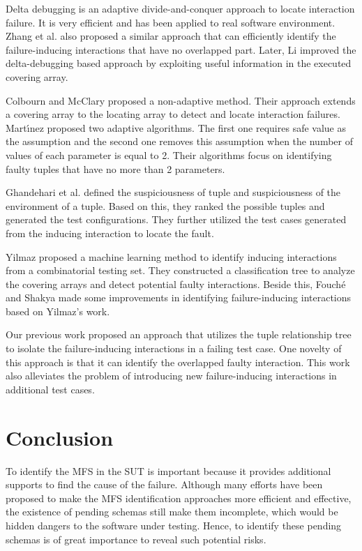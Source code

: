 {Delta debugging \cite{zeller2002simplifying} is an adaptive divide-and-conquer approach to locate interaction failure. It is very efficient and has been applied to real software environment. Zhang et al. \cite{zhang2011characterizing} also proposed a similar approach that can efficiently identify the failure-inducing interactions that have no overlapped part. Later, Li \cite{li2012improved} improved the delta-debugging based approach by exploiting useful information in the executed covering array.

Colbourn and McClary \cite{colbourn2008locating} proposed a non-adaptive method. Their approach extends a covering array to the locating array to detect and locate interaction failures. Mart{\'\i}nez \cite{martinez2008algorithms,martinez2009locating} proposed two adaptive algorithms. The first one requires safe value as the assumption and the second one removes this assumption when the number of values of each parameter is equal to 2. Their algorithms focus on identifying faulty tuples that have no more than 2 parameters.

Ghandehari et al. \cite{ghandehari2012identifying} defined the suspiciousness of tuple and suspiciousness of the environment of a tuple. Based on this, they ranked the possible tuples and generated the test configurations. They \cite{ghandehari2013fault} further utilized the test cases generated from the inducing interaction to locate the fault.

Yilmaz \cite{yilmaz2006covering} proposed a machine learning method to identify inducing interactions from a combinatorial testing set. They constructed a classification tree to analyze the covering arrays and detect potential faulty interactions. Beside this, Fouch{\'e} \cite{fouche2009incremental} and Shakya \cite{shakya2012isolating} made some improvements in identifying failure-inducing interactions based on Yilmaz's work.

Our previous work \cite{niu2013identifying} proposed an approach that utilizes the tuple relationship tree to isolate the failure-inducing interactions in a failing test case. One novelty of this approach is that it can identify the overlapped faulty interaction. This work also alleviates the problem of introducing new failure-inducing interactions in additional test cases.



\section{Conclusion}\label{sec:conclusion}
To identify the MFS in the SUT is important because it provides additional supports to find the cause of the failure. Although many efforts have been proposed to make the MFS identification approaches more efficient and effective, the existence of pending schemas still make them incomplete, which would be hidden dangers to the software under testing. Hence, to identify these pending schemas is of great importance to reveal such potential risks.

}
